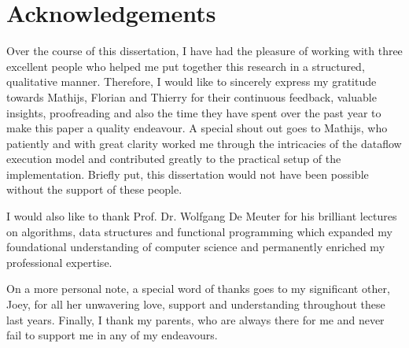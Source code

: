 \section*{Acknowledgements}

Over the course of this dissertation, I have had the pleasure of working with three excellent people who helped me put together this research in a structured, qualitative manner. Therefore, I would like to sincerely express my gratitude towards Mathijs, Florian and Thierry for their continuous feedback, valuable insights, proofreading and also the time they have spent over the past year to make this paper a quality endeavour. A special shout out goes to Mathijs, who patiently and with great clarity worked me through the intricacies of the dataflow execution model and contributed greatly to the practical setup of the implementation. Briefly put, this dissertation would not have been possible without the support of these people. 

\smallskip

I would also like to thank Prof. Dr. Wolfgang De Meuter for his brilliant lectures on algorithms, data structures and functional programming which expanded my foundational understanding of computer science and permanently enriched my professional expertise.

\smallskip

On a more personal note, a special word of thanks goes to my significant other, Joey, for all her unwavering love, support and understanding throughout these last years. Finally, I thank my parents, who are always there for me and never fail to support me in any of my endeavours. 